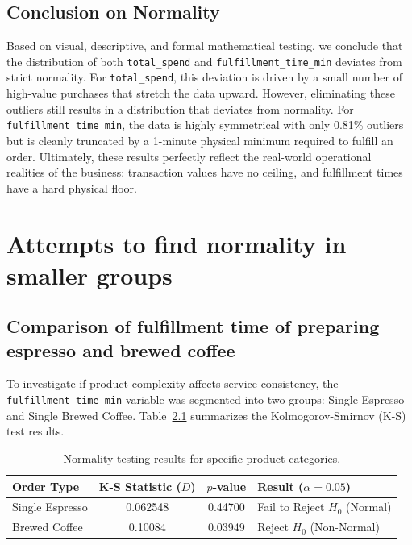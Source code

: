 \documentclass[12pt]{report}
\begin{document}
\section{Conclusion on Normality}
Based on visual, descriptive, and formal mathematical testing, we conclude that the distribution of both \texttt{total\_spend} and \texttt{fulfillment\_time\_min} deviates from strict normality.
For \texttt{total\_spend}, this deviation is driven by a small number of high-value purchases that stretch the data upward. However, eliminating these outliers still results in a distribution that deviates from normality.
For \texttt{fulfillment\_time\_min}, the data is highly symmetrical with only 0.81\% outliers but is cleanly truncated by a 1-minute physical minimum required to fulfill an order. Ultimately, these results perfectly reflect the real-world operational realities of the business: transaction values have no ceiling, and fulfillment times have a hard physical floor.

\chapter{Attempts to find normality in smaller groups}

\section{Comparison of fulfillment time of preparing espresso and brewed coffee}

To investigate if product complexity affects service consistency, the \texttt{fulfillment\_time\_min} variable was segmented into two groups: Single Espresso and Single Brewed Coffee.
\newline
Table~\ref{tab:ks_small_groups_comparison} summarizes the Kolmogorov-Smirnov (K-S) test results.

\begin{table}[h]
    \centering
    \begin{tabular}{l|c|c|l}
        \textbf{Order Type} & \textbf{K-S Statistic (\(D\))} & \textbf{\(p\)-value} & \textbf{Result (\(\alpha=0.05\))} \\ \hline
        Single Espresso     & 0.062548                     & 0.44700            & Fail to Reject \(H_0\) (Normal)   \\
        Brewed Coffee       & 0.10084                      & 0.03949            & Reject \(H_0\) (Non-Normal)       \\
    \end{tabular}
    \caption{Normality testing results for specific product categories.}
    \label{tab:ks_small_groups_comparison}
\end{table}
\end{document}
